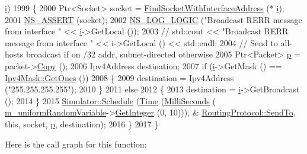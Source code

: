 \begin{DoxyCode}
      \hyperlink{bernuolliDistribution_8m_a6f6ccfcf58b31cb6412107d9d5281426}{i})
1999     \{
2000       Ptr<Socket> socket = \hyperlink{classns3_1_1aodv_1_1RoutingProtocol_a7cebc7baa398569f432ea2521310dffe}{FindSocketWithInterfaceAddress} (*
      \hyperlink{bernuolliDistribution_8m_a6f6ccfcf58b31cb6412107d9d5281426}{i});
2001       \hyperlink{assert_8h_a6dccdb0de9b252f60088ce281c49d052}{NS\_ASSERT} (socket);
2002       \hyperlink{group__logging_ga88acd260151caf2db9c0fc84997f45ce}{NS\_LOG\_LOGIC} (\textcolor{stringliteral}{"Broadcast RERR message from interface "} << \hyperlink{bernuolliDistribution_8m_a6f6ccfcf58b31cb6412107d9d5281426}{i}->GetLocal ());
2003       \textcolor{comment}{// std::cout << "Broadcast RERR message from interface " << i->GetLocal () << std::endl;}
2004       \textcolor{comment}{// Send to all-hosts broadcast if on /32 addr, subnet-directed otherwise}
2005       Ptr<Packet> \hyperlink{lte__link__budget_8m_ac9de518908a968428863f829398a4e62}{p} = packet->\hyperlink{classns3_1_1Packet_a5d5c70802a5f77fc5f0001e0cfc1898b}{Copy} ();
2006       Ipv4Address destination;
2007       \textcolor{keywordflow}{if} (\hyperlink{bernuolliDistribution_8m_a6f6ccfcf58b31cb6412107d9d5281426}{i}->GetMask () == \hyperlink{classns3_1_1Ipv4Mask_af712cbdf28c039025d4aa45fa7e243dd}{Ipv4Mask::GetOnes} ())
2008         \{
2009           destination = Ipv4Address (\textcolor{stringliteral}{"255.255.255.255"});
2010         \}
2011       \textcolor{keywordflow}{else}
2012         \{ 
2013           destination = \hyperlink{bernuolliDistribution_8m_a6f6ccfcf58b31cb6412107d9d5281426}{i}->GetBroadcast ();
2014         \}
2015       \hyperlink{classns3_1_1Simulator_a671882c894a08af4a5e91181bf1eec13}{Simulator::Schedule} (\hyperlink{namespacens3_1_1TracedValueCallback_a7ffd3e7c142ffe7c8a1d2db9b8de38ec}{Time} (\hyperlink{group__timecivil_gaf26127cf4571146b83a92ee18679c7a9}{MilliSeconds} (
      \hyperlink{classns3_1_1aodv_1_1RoutingProtocol_a62dd29f4ef02720f5c1c00214dfdd7f9}{m\_uniformRandomVariable}->\hyperlink{classns3_1_1RandomVariableStream_a66cd94e6305ce7f000f1a9ff0fcb9aef}{GetInteger} (0, 10))), &
      \hyperlink{classns3_1_1aodv_1_1RoutingProtocol_a41daaba7b2254917daa563575572c1ed}{RoutingProtocol::SendTo}, \textcolor{keyword}{this}, socket, \hyperlink{lte__link__budget_8m_ac9de518908a968428863f829398a4e62}{p}, destination);
2016     \}
2017 \}
\end{DoxyCode}


Here is the call graph for this function\+:




